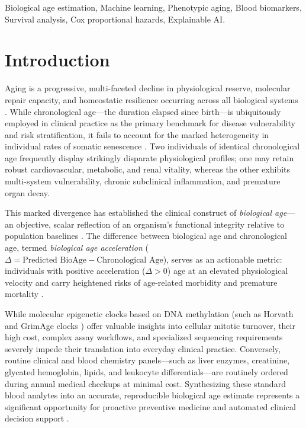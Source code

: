 \documentclass[conference]{IEEEtran}
\begin{document}
\begin{IEEEkeywords}
Biological age estimation, Machine learning, Phenotypic aging, Blood biomarkers, Survival analysis, Cox proportional hazards, Explainable AI.
\end{IEEEkeywords}

\section{Introduction}
Aging is a progressive, multi-faceted decline in physiological reserve, molecular repair capacity, and homeostatic resilience occurring across all biological systems \cite{lopez2013hallmarks}. While chronological age---the duration elapsed since birth---is ubiquitously employed in clinical practice as the primary benchmark for disease vulnerability and risk stratification, it fails to account for the marked heterogeneity in individual rates of somatic senescence \cite{crimmins2008biomarkers}. Two individuals of identical chronological age frequently display strikingly disparate physiological profiles; one may retain robust cardiovascular, metabolic, and renal vitality, whereas the other exhibits multi-system vulnerability, chronic subclinical inflammation, and premature organ decay.

This marked divergence has established the clinical construct of \textit{biological age}---an objective, scalar reflection of an organism's functional integrity relative to population baselines \cite{belsky2015quantification}. The difference between biological age and chronological age, termed \textit{biological age acceleration} ($\Delta = \text{Predicted BioAge} - \text{Chronological Age}$), serves as an actionable metric: individuals with positive acceleration ($\Delta > 0$) age at an elevated physiological velocity and carry heightened risks of age-related morbidity and premature mortality \cite{levine2018epigenetic}.

While molecular epigenetic clocks based on DNA methylation (such as Horvath and GrimAge clocks \cite{horvath2013dna, lu2019dna}) offer valuable insights into cellular mitotic turnover, their high cost, complex assay workflows, and specialized sequencing requirements severely impede their translation into everyday clinical practice. Conversely, routine clinical and blood chemistry panels---such as liver enzymes, creatinine, glycated hemoglobin, lipids, and leukocyte differentials---are routinely ordered during annual medical checkups at minimal cost. Synthesizing these standard blood analytes into an accurate, reproducible biological age estimate represents a significant opportunity for proactive preventive medicine and automated clinical decision support \cite{zhavoronkov2019deep}.
\end{document}
